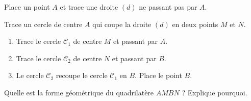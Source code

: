 \begin{myenumerate}
  \item Place un point $A$ et trace une droite $(d)$ ne passant pas
    par $A$.
  \item Trace un cercle de centre $A$ qui coupe la droite $(d)$ en
    deux points $M$ et $N$.
  \item
    \begin{enumerate}
    \item Trace le cercle $\mathscr{C}_1$ de centre $M$ et passant par
      $A$.
    \item Trace le cercle $\mathscr{C}_2$ de centre $N$ et passant par
      $B$.
    \item Le cercle $\mathscr{C}_2$ recoupe le cercle $\mathscr{C}_1$
      en $B$. Place le point $B$.
    \end{enumerate}
  \item Quelle est la forme géométrique du quadrilatère $AMBN$ ?
    Explique pourquoi.
\end{myenumerate}